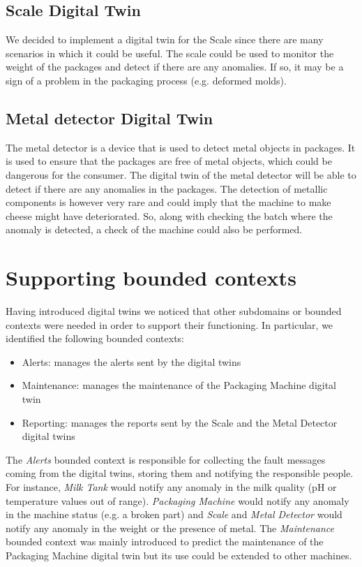\subsection{Scale Digital Twin}
We decided to implement a digital twin for the Scale since there are many scenarios in which it could be useful.
The scale could be used to monitor the weight of the packages and detect if there are any anomalies. If so, it may be a sign of a problem in the packaging process (e.g. deformed molds).

\subsection{Metal detector Digital Twin}
The metal detector is a device that is used to detect metal objects in packages. It is used to ensure that the packages are free of metal objects, which could be dangerous for the consumer.
The digital twin of the metal detector will be able to detect if there are any anomalies in the packages.
The detection of metallic components is however very rare and could imply that the machine to make cheese might have deteriorated. So, along with checking the batch where the anomaly is detected, a check of the machine could also be performed.


\section{Supporting bounded contexts}
Having introduced digital twins we noticed that other subdomains or bounded contexts were needed in order to support their functioning.
In particular, we identified the following bounded contexts:
\begin{itemize}
    \item Alerts: manages the alerts sent by the digital twins
    \item Maintenance: manages the maintenance of the Packaging Machine digital twin
    \item Reporting: manages the reports sent by the Scale and the Metal Detector digital twins
\end{itemize}

The \textit{Alerts} bounded context is responsible for collecting the fault messages coming from the digital twins, storing them and notifying the responsible people.
For instance, \textit{Milk Tank} would notify any anomaly in the milk quality (pH or temperature values out of range).
\textit{Packaging Machine} would notify any anomaly in the machine status (e.g. a broken part) and \textit{Scale} and \textit{Metal Detector} would notify any anomaly in the weight or the presence of metal.
The \textit{Maintenance} bounded context was mainly introduced to predict the maintenance of the Packaging Machine digital twin but its use could be extended to other machines.

